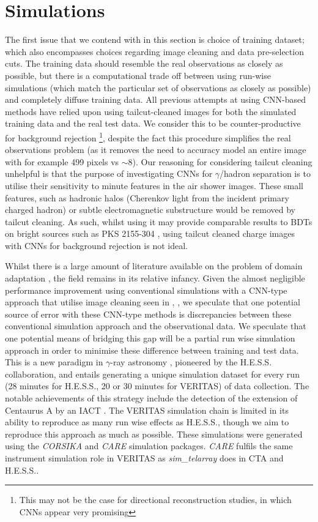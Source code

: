 \section{Simulations}
The first issue that we contend with in this section is choice of training dataset; which also encompasses choices regarding image cleaning and data pre-selection cuts. The training data should resemble the real observations as closely as possible, but there is a computational trade off between using run-wise simulations (which match the particular set of observations as closely as possible) and completely diffuse training data. All previous attempts at using CNN-based methods have relied upon using tailcut-cleaned images \cite{Shilon} for both the simulated training data and the real test data. We consider this to be counter-productive for background rejection \footnote{This may not be the case for directional reconstruction studies, in which CNNs appear very promising}, despite the fact this procedure simplifies the real observations problem (as it removes the need to accuracy model an entire image with for example 499 pixels vs $\sim$8). Our reasoning for considering tailcut cleaning unhelpful is that the purpose of investigating CNNs for $\gamma$/hadron separation is to utilise their sensitivity to minute features in the air shower images. These small features, such as hadronic halos \cite{model++} (Cherenkov light from the incident primary charged hadron) or subtle electromagnetic substructure would be removed by tailcut cleaning. As such, whilst using it may provide comparable results to BDTs on bright sources such as PKS 2155-304 \cite{Shilon}, using tailcut cleaned charge images with CNNs for background rejection is not ideal.

Whilst there is a large amount of literature available on the problem of domain adaptation \cite{ada}, the field remains in its relative infancy. Given the almost negligible performance improvement using conventional simulations with a CNN-type approach that utilise image cleaning seen in \cite{Shilon}, \cite{ParsonsOhm}, we speculate that one potential source of error with these CNN-type methods is discrepancies between these conventional simulation approach and the observational data. We speculate that one potential means of bridging this gap will be a partial run wise simulation approach in order to minimise these difference between training and test data. This is a new paradigm in $\gamma$-ray astronomy \cite{rws}, pioneered by the H.E.S.S. collaboration, and entails generating a unique simulation dataset for every run (28 minutes for H.E.S.S., 20 or 30 minutes for VERITAS) of data collection. The notable achievements of this strategy include the detection of the extension of Centaurus A by an IACT \cite{cena}. The VERITAS simulation chain is limited in its ability to reproduce as many run wise effects as H.E.S.S., though we aim to reproduce this approach as much as possible. These simulations were generated using the \textit{CORSIKA} and \textit{CARE} \cite{CARE} simulation packages. \textit{CARE} fulfils the same instrument simulation role in VERITAS as \textit{sim\_telarray} does in CTA and H.E.S.S..

